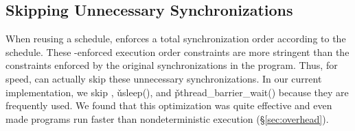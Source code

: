 




\subsection{Skipping Unnecessary Synchronizations}  \label{sec:skip-waits}

When reusing a schedule, \tern enforces a total synchronization order
according to the schedule.  These \tern-enforced execution order constraints
are more stringent than the constraints enforced by the original
synchronizations in the program.  Thus, for speed, \tern can actually skip
these unnecessary synchronizations.  In our current implementation, we
skip , \v{usleep()}, and \v{pthread\_barrier\_wait()}
because they are frequently used.  We
found that this optimization was quite effective and
even made programs run faster than nondeterministic execution
(\S\ref{sec:overhead}).


